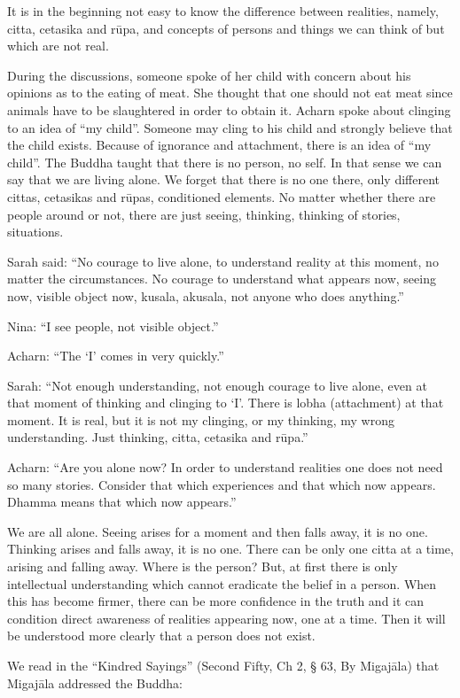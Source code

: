 It is in the beginning not easy to know the difference between
realities, namely, citta, cetasika and rūpa, and concepts of persons and
things we can think of but which are not real.

During the discussions, someone spoke of her child with concern about
his opinions as to the eating of meat. She thought that one should not
eat meat since animals have to be slaughtered in order to obtain it.
Acharn spoke about clinging to an idea of ``my child''. Someone may
cling to his child and strongly believe that the child exists. Because
of ignorance and attachment, there is an idea of ``my child''. The
Buddha taught that there is no person, no self. In that sense we can say
that we are living alone. We forget that there is no one there, only
different cittas, cetasikas and rūpas, conditioned elements. No matter
whether there are people around or not, there are just seeing, thinking,
thinking of stories, situations.

Sarah said: ``No courage to live alone, to understand reality at this
moment, no matter the circumstances. No courage to understand what
appears now, seeing now, visible object now, kusala, akusala, not anyone
who does anything.''

Nina: ``I see people, not visible object.''

Acharn: ``The `I' comes in very quickly.''

Sarah: ``Not enough understanding, not enough courage to live alone,
even at that moment of thinking and clinging to `I'. There is lobha
(attachment) at that moment. It is real, but it is not my clinging, or
my thinking, my wrong understanding. Just thinking, citta, cetasika and
rūpa.''

Acharn: ``Are you alone now? In order to understand realities one does
not need so many stories. Consider that which experiences and that which
now appears. Dhamma means that which now appears.''

We are all alone. Seeing arises for a moment and then falls away, it is
no one. Thinking arises and falls away, it is no one. There can be only
one citta at a time, arising and falling away. Where is the person? But,
at first there is only intellectual understanding which cannot eradicate
the belief in a person. When this has become firmer, there can be more
confidence in the truth and it can condition direct awareness of
realities appearing now, one at a time. Then it will be understood more
clearly that a person does not exist.

We read in the ``Kindred Sayings'' (Second Fifty, Ch 2, § 63, By
Migajāla) that Migajāla addressed the Buddha:

